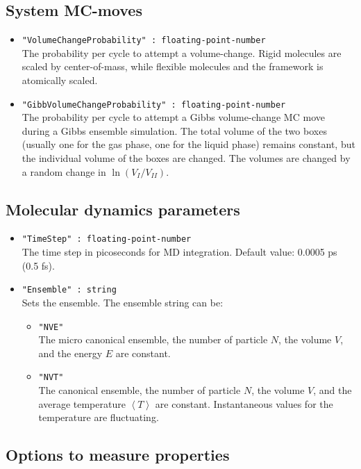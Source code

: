 \subsection{System MC-moves}

\begin{itemize}
\item{\verb+"VolumeChangeProbability" : floating-point-number+}\\
The probability per cycle to attempt a volume-change. 
Rigid molecules are scaled by center-of-mass, while flexible molecules and the framework is atomically scaled.
\item{\verb+"GibbVolumeChangeProbability" : floating-point-number+}\\
The probability per cycle to attempt a Gibbs volume-change MC move during a Gibbs ensemble simulation. The total volume of the two boxes
(usually one for the gas phase, one for the liquid phase) remains constant, but the individual volume of the boxes are changed.
The volumes are changed by a random change in $\ln(V_I/V_{II})$.
\end{itemize}

\subsection{Molecular dynamics parameters}

\begin{itemize}
\item{\verb+"TimeStep" : floating-point-number+}\\
The time step in picoseconds for MD integration. Default value: 0.0005 ps (0.5 fs).
\item{\verb+"Ensemble" : string+}\\
Sets the ensemble. The ensemble string can be:
  \begin{itemize}
  \item{\verb+"NVE"+}\\
  The micro canonical ensemble, the number of particle $N$, the volume $V$, and the energy $E$ are constant.
  \item{\verb+"NVT"+}\\
  The canonical ensemble, the number of particle $N$, the volume $V$, and the average temperature $\left\langle T\right\rangle$
  are constant. Instantaneous values for the temperature are fluctuating.
  \end{itemize}
\end{itemize}

\subsection{Options to measure properties}


